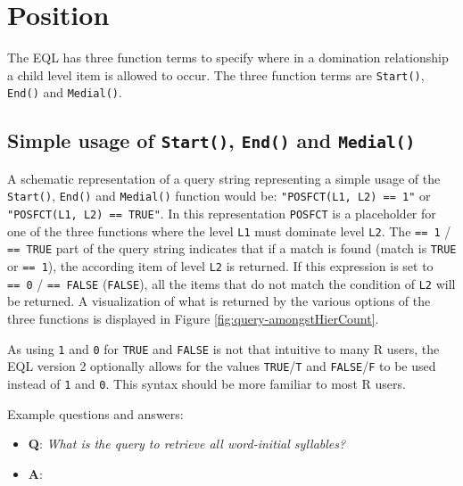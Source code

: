 \documentclass[]{book}
\providecommand{\tightlist}{%
  \setlength{\itemsep}{0pt}\setlength{\parskip}{0pt}}
\theoremstyle{definition}
\theoremstyle{definition}
\theoremstyle{definition}
\theoremstyle{remark}
\begin{document}
\hypertarget{position}{%
\section{Position}\label{position}}

The EQL has three function terms to specify where in a domination
relationship a child level item is allowed to occur. The three function
terms are \texttt{Start()}, \texttt{End()} and \texttt{Medial()}.

\hypertarget{simple-usage-of-start-end-and-medial}{%
\subsection{\texorpdfstring{Simple usage of \texttt{Start()},
\texttt{End()} and
\texttt{Medial()}}{Simple usage of Start(), End() and Medial()}}\label{simple-usage-of-start-end-and-medial}}

A schematic representation of a query string representing a simple usage
of the \texttt{Start()}, \texttt{End()} and \texttt{Medial()} function
would be: \texttt{"POSFCT(L1,\ L2)\ ==\ 1"} or
\texttt{"POSFCT(L1,\ L2)\ ==\ TRUE"}. In this representation
\texttt{POSFCT} is a placeholder for one of the three functions where
the level \texttt{L1} must dominate level \texttt{L2}. The
\texttt{==\ 1} / \texttt{==\ TRUE} part of the query string indicates
that if a match is found (match is \texttt{TRUE} or \texttt{==\ 1}), the
according item of level \texttt{L2} is returned. If this expression is
set to \texttt{==\ 0} / \texttt{==\ FALSE} (\texttt{FALSE}), all the
items that do not match the condition of \texttt{L2} will be returned. A
visualization of what is returned by the various options of the three
functions is displayed in Figure \ref{fig:query-amongstHierCount}.

As using \texttt{1} and \texttt{0} for \texttt{TRUE} and \texttt{FALSE}
is not that intuitive to many R users, the EQL version 2 optionally
allows for the values \texttt{TRUE}/\texttt{T} and
\texttt{FALSE}/\texttt{F} to be used instead of \texttt{1} and
\texttt{0}. This syntax should be more familiar to most R users.

Example questions and answers:

\begin{itemize}
\tightlist
\item
  \textbf{Q}: \emph{What is the query to retrieve all word-initial
  syllables?}
\item
  \textbf{A}:
\end{itemize}
\end{document}
